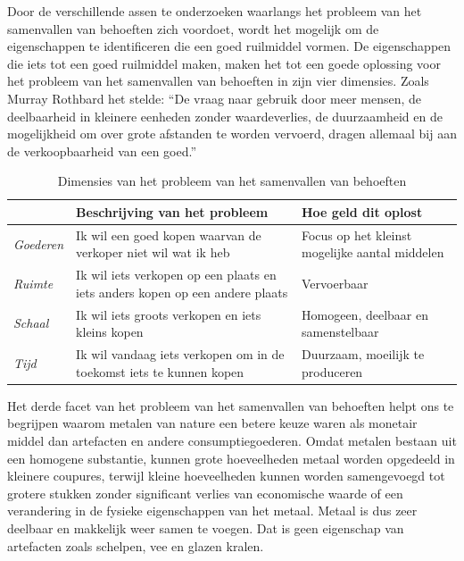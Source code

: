 Door de verschillende assen te onderzoeken waarlangs het probleem van het samenvallen van behoeften zich voordoet, wordt het mogelijk om de eigenschappen te identificeren die een goed ruilmiddel vormen. De eigenschappen die iets tot een goed ruilmiddel maken, maken het tot een goede oplossing voor het probleem van het samenvallen van behoeften in zijn vier dimensies. Zoals Murray Rothbard het stelde: ``De vraag naar gebruik door meer mensen, de deelbaarheid in kleinere eenheden zonder waardeverlies, de duurzaamheid en de mogelijkheid om over grote afstanden te worden vervoerd, dragen allemaal bij aan de verkoopbaarheid van een goed.''\autocite{110}

\begin{table}[!htb]
\centering
\begin{tabular}{| p{1.2cm} | p{4.2cm} | p{4.2cm} |}
\hline
 & \textbf{Beschrijving van het probleem} & \textbf{Hoe geld dit oplost} \\ \hline
\textit{Goederen} & Ik wil een goed kopen waarvan de verkoper niet wil wat ik heb & Focus op het kleinst mogelijke aantal middelen \\ \hline
\textit{Ruimte} & Ik wil iets verkopen op een plaats en iets anders kopen op een andere plaats & Vervoerbaar \\ \hline
\textit{Schaal} & Ik wil iets groots verkopen en iets kleins kopen & Homogeen, deelbaar en samenstelbaar \\ \hline
\textit{Tijd} & Ik wil vandaag iets verkopen om in de toekomst iets te kunnen kopen & Duurzaam, moeilijk te produceren \\ \hline
\end{tabular}
\caption{Dimensies van het probleem van het samenvallen van behoeften}
\end{table}\label{tab2}


Het derde facet van het probleem van het samenvallen van behoeften helpt ons te begrijpen waarom metalen van nature een betere keuze waren als monetair middel dan artefacten en andere consumptiegoederen. Omdat metalen bestaan uit een homogene substantie, kunnen grote hoeveelheden metaal worden opgedeeld in kleinere coupures, terwijl kleine hoeveelheden kunnen worden samengevoegd tot grotere stukken zonder significant verlies van economische waarde of een verandering in de fysieke eigenschappen van het metaal. Metaal is dus zeer deelbaar en makkelijk weer samen te voegen. Dat is geen eigenschap van artefacten zoals schelpen, vee en glazen kralen.

